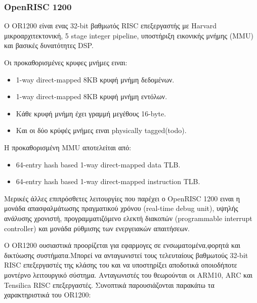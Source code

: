 \documentclass[a4paper,10pt]{article}
\numberwithin{figure}{subsection}
\numberwithin{table}{subsection}
\begin{document}
{\subsubsection{OpenRISC 1200}
 Ο OR1200 είναι ενας 32-bit βαθμωτός RISC επεξεργαστής με Harvard μικροαρχιτεκτονική,
5 stage integer pipeline, υποστήριξη εικονικής μνήμης (MMU) και βασικές δυνατότητες
DSP.

Οι προκαθορισμένες κρυφες μνήμες ειναι:
\begin{itemize}
 \item 1-way direct-mapped 8KB κρυφή μνήμη δεδομένων.
 \item 1-way direct-mapped 8KB κρυφή μνήμη εντόλων.
 \item Κάθε κρυφή μνήμη έχει γραμμή μεγέθους 16-byte.
 \item Και οι δύο κρύφές μνήμες ειναι  physically tagged(todo).
\end{itemize}

Η προκαθορισμένη MMU αποτελείται από:
\begin{itemize}
 \item 64-entry hash based 1-way direct-mapped data TLB.
 \item 64-entry hash based 1-way direct-mapped instruction TLB.
\end{itemize}

Μερικές άλλες επιπρόσθετες λειτουργίες που παρέχει ο OpenRISC 1200 ειναι η μονάδα
απασφαλμάτωσης πραγματικού χρόνου (real-time debug unit), υψηλής ανάλυσης χρονιστή,
προγραμματιζόμενο ελεκτή διακοπών (programmable interrupt controller) και μονάδα
ρύθμισης των ενεργειακών απαιτήσεων.


Ο OR1200 ουσιαστικά προορίζεται για εφαρμογες σε ενσωματομένα,φορητά και δικτύωσης
συστήματα.Μπορεί να ανταγωνιστεί τους τελευταίους βαθμωτούς 32-bit RISC επεξεργαστές
της κλάσης του και να υποστηρίξει αποδοτικά οποιοδήποτε μοντέρνο λειτουργικό σύστημα.
Ανταγωνιστές του θεωρούνται οι ARM10, ARC και Tensilica RISC επεξεργαστές.
\newline
Συνοπτικά παρουσιάζονται παρακάτω τα χαρακτηριστικά του OR1200:


}
\end{document}
